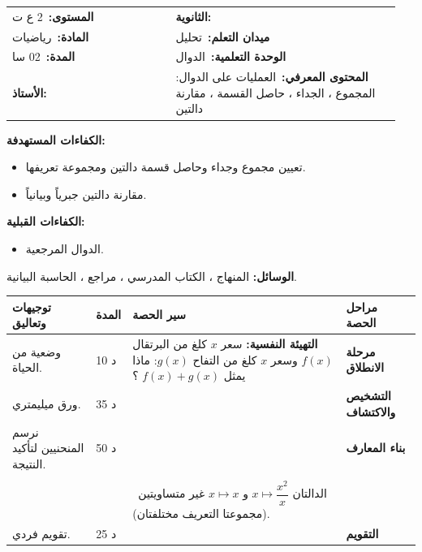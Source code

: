 \documentclass[12pt,a4paper]{article}
\makeatletter
\newenvironment{LTR}{\begin{otherlanguage}{english}}{\end{otherlanguage}}
\newcommand{\ar}[1]{\foreignlanguage{arabic}{#1}}
\newcommand{\Phase}[1]{\textbf{#1}}
\newcommand{\Fld}[2]{\textbf{#1:}\ #2}
\newcommand{\ModhHead}[9]{%
\begin{LTR}
\begin{tcolorbox}[enhanced,colback=white,colframe=cThm!85!black,arc=4mm,boxrule=1pt,top=14pt,bottom=6pt,left=8pt,right=8pt,
 overlay={\node[fill=cThm!85!black,text=white,rounded corners=3mm,inner xsep=14pt,inner ysep=4pt,font=\large\bfseries] at ([yshift=0pt]frame.north){\ar{مذكرة رقم #1}};},
 before upper={\selectlanguage{arabic}}]
\begin{tabular}{@{}p{0.4\linewidth}p{0.55\linewidth}@{}}
\Fld{المستوى}{#2} & \Fld{الثانوية}{\dotfill}\\[3pt]
\Fld{المادة}{رياضيات} & \Fld{ميدان التعلم}{#3}\\[3pt]
\Fld{المدة}{#5} & \Fld{الوحدة التعلمية}{#4}\\[3pt]
\Fld{الأستاذ}{\dotfill} & \Fld{المحتوى المعرفي}{#6}\\
\end{tabular}
\end{tcolorbox}
\begin{tcolorbox}[enhanced,colback=white,colframe=cThm!85!black,arc=3mm,boxrule=0.8pt,sidebyside,sidebyside align=top,lefthand ratio=0.5,
 segmentation style={dashed,cThm!60},before upper={\selectlanguage{arabic}},before lower={\selectlanguage{arabic}}]
\textbf{الكفاءات المستهدفة:}\par #8
\tcblower
\textbf{الكفاءات القبلية:}\par #7
\end{tcolorbox}
\end{LTR}
\par\smallskip\textbf{الوسائل:} #9\par\smallskip}
\newenvironment{Sayr}{%
\begin{LTR}\renewcommand{\arraystretch}{1.25}
\begin{longtable}{|p{0.17\textwidth}|>{\centering\arraybackslash}p{0.06\textwidth}|p{0.53\textwidth}|>{\centering\arraybackslash}p{0.12\textwidth}|}
\hline\rowcolor{cThm!12}\ar{\textbf{توجيهات وتعاليق}} & \ar{\textbf{المدة}} & \ar{\textbf{سير الحصة}} & \ar{\textbf{مراحل الحصة}}\\\hline\endhead
\hline\endfoot}{\end{longtable}\end{LTR}}
\newcommand{\Row}[4]{\ar{\small #4} & \ar{#3} & \ar{#2} & \cellcolor{cThm!8}\ar{\Phase{#1}}\\\hline}
\newcommand{\Lab}[2]{\foreignlanguage{english}{\tcbox[on line,colback=#1,colframe=#1,boxrule=0pt,arc=2pt,boxsep=1pt,left=5pt,right=5pt,top=1pt,bottom=1pt]{\ar{\textcolor{white}{\textbf{#2}}}}}}
\newcommand{\ck}{\ensuremath{{\color{cRem}\checkmark}}}
\makeatother
\begin{document}
\newpage
\ModhHead{02}{2 ع ت}{تحليل}{الدوال}{02 سا}{العمليات على الدوال: المجموع ، الجداء ، حاصل القسمة ، مقارنة دالتين}%
{\begin{itemize}\item الدوال المرجعية.\end{itemize}}%
{\begin{itemize}\item تعيين مجموع وجداء وحاصل قسمة دالتين ومجموعة تعريفها.\item مقارنة دالتين جبرياً وبيانياً.\end{itemize}}%
{المنهاج ، الكتاب المدرسي ، مراجع ، الحاسبة البيانية.}
\begin{Sayr}
\Row{مرحلة الانطلاق}{%
\textbf{التهيئة النفسية:} سعر $x$ كلغ من البرتقال $f(x)$ وسعر $x$ كلغ من التفاح $g(x)$: ماذا يمثل $f(x)+g(x)$ ؟}{10 د}{وضعية من الحياة.}
\Row{التشخيص والاكتشاف}{%
\Lab{cEx}{مناقشة نشاط 03 صفحة 8}\par\ck\ رسم منحنيين على ورق ميليمتري ، واستنتاج حلول معادلة $f(x)=g(x)$ بيانياً: فواصل نقط التقاطع.\par
\ck\ التحقق بالحساب.\par
}{35 د}{ورق ميليمتري.}
\Row{بناء المعارف}{%
\Lab{cDef}{تعريف}\ $f$ و $g$ دالتان معرفتان على $D$ ، $\lambda$ عدد حقيقي:\par\ck\ $(f+g)(x)=f(x)+g(x)$ ، $(\lambda f)(x)=\lambda f(x)$ ، $(f\times g)(x)=f(x)\times g(x)$.\par
\ck\ $\left(\dfrac fg\right)(x)=\dfrac{f(x)}{g(x)}$ معرفة حيث $g(x)\neq0$.\par
\Lab{cDef}{تساوي ومقارنة دالتين}\par\ck\ $f=g$ معناه: لهما نفس مجموعة التعريف $D$ و $f(x)=g(x)$ لكل $x$ من $D$.\par
\ck\ $f\leqslant g$ على $I$ معناه $f(x)\leqslant g(x)$ لكل $x$ من $I$: $C_f$ تحت $C_g$.\par
}{50 د}{نرسم المنحنيين لتأكيد النتيجة.}
\Row{}{%
\Lab{cMeth}{دراسة الوضع النسبي}\ ندرس إشارة الفرق $f(x)-g(x)$.\par\Lab{cEx}{مثال}\ $f(x)=x^2$ ، $g(x)=2x-1$: $f(x)-g(x)=(x-1)^2\geqslant0$ ، إذن $C_f$ فوق $C_g$ ويتقاطعان في النقطة $(1;1)$.\par}{}{}
\Row{}{%
\Lab{cThm!80!black}{حذار}\ الدالتان $x\mapsto\dfrac{x^2}x$ و $x\mapsto x$ غير متساويتين (مجموعتا التعريف مختلفتان).}{}{}
\Row{التقويم}{%
\Lab{cEx}{تطبيق}\par قارن الدالتين $f(x)=x$ و $g(x)=x^2$ على المجال $[0;1]$.\par\textbf{الحل:} $f(x)-g(x)=x(1-x)\geqslant0$ على $[0;1]$ ، إذن $x^2\leqslant x$ و $C_g$ تحت $C_f$.\par\textbf{واجب منزلي:} تمارين من الكتاب المدرسي.\par\smallskip\textbf{ملاحظات حول سير الحصة:} \dotfill}{25 د}{تقويم فردي.}
\end{Sayr}
\end{document}
